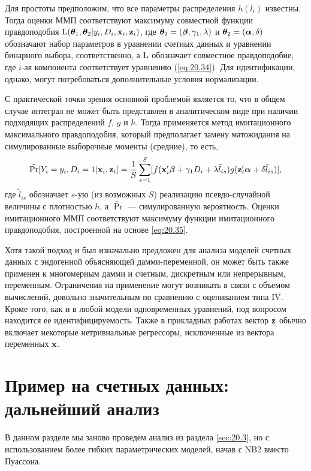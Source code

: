 Для простоты предположим, что все параметры распределения $h(l_i)$ известны. Тогда оценки ММП соответствуют максимуму совместной функции правдоподобия $\mathrm{L}(\bm{\theta}_1, \bm{\theta}_2|y_i, D_i, \mathbf{x}_i, \mathbf{z}_i)$, где $\bm{\theta}_1 = (\bm{\beta}, \gamma_1, \lambda)$ и $\bm{\theta}_2 = (\bm{\alpha}, \delta)$ обозначают набор параметров в уравнении счетных данных и уравнении бинарного выбора, соответственно, а $\mathrm{L}$ обозначает совместное правдоподобие, где $i$-ая компонента соответствует уравнению (\ref{eq:20.34}). Для идентификации, однако, могут потребоваться дополнительные условия нормализации.

С практической точки зрения основной проблемой является то, что в общем случае интеграл не может быть представлен в аналитическом виде при наличии подходящих распределений $f$, $g$ и $h$. Тогда применяется метод имитационного максимального правдоподобия, который предполагает замену матожидания на симулированные выборочные моменты (средние), то есть,
    \begin{align}\label{eq:20.35}
    \tilde{\mathrm{Pr}}[Y_i = y_i, D_i = 1|\mathbf{x}_i, \mathbf{z}_i] = \frac{1}{S} \sum^{S}_{s = 1}[f(\mathbf{x}_i'\bm{\beta} + \gamma_1 D_i +\lambda \tilde{l}_{is})g(\mathbf{z}'_i\bm{\alpha} + \delta\tilde{l}_{is})],
    \end{align}
где $\tilde{l}_{is}$ обозначает $s$-ую (из возможных $S$) реализацию псевдо-случайной величины с плотностью $h$, а $\tilde{\Pr}$ --- симулированную вероятность. Оценки имитационного ММП соответствуют максимуму функции имитационного правдоподобия, построенной на основе \ref{eq:20.35}.

Хотя такой подход и был изначально предложен для анализа моделей счетных данных с эндогенной объясняющей дамми-переменной, он может быть также применен к многомерным дамми и счетным, дискретным или непрерывным, переменным. Ограничения на применение могут возникать в связи с объемом вычислений, довольно значительным по сравнению с оцениванием типа IV. Кроме того, как и в любой модели одновременных уравнений, под вопросом находится ее идентифицируемость. Также в прикладных работах вектор $\mathbf{z}$ обычно включает некоторые нетривиальные регрессоры, исключенные из вектора переменных $\mathbf{x}$.




\section{Пример на счетных данных: дальнейший анализ}\label{sec:20.7}

\noindent
В данном разделе мы заново проведем анализ из раздела \ref{sec:20.3}, но с использованием более гибких параметрических моделей, начав с NB2 вместо Пуассона.

